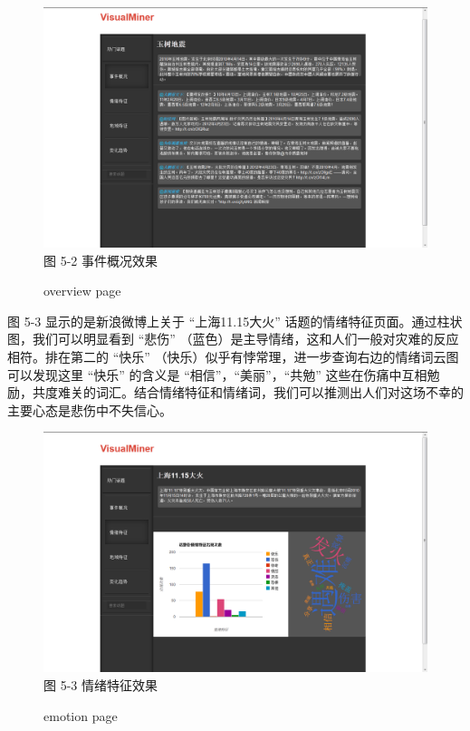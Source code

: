 \begin {figure}[!h]
\centering
\includegraphics[width=\textwidth, height=0.4\textheight]{show_overview}
图 5-2 事件概况效果
\caption{overview page}
\end{figure}


图 5-3 显示的是新浪微博上关于 “上海11.15大火” 话题的情绪特征页面。通过柱状图，我们可以明显看到 “悲伤” （蓝色）是主导情绪，这和人们一般对灾难的反应相符。排在第二的 “快乐” （快乐）似乎有悖常理，进一步查询右边的情绪词云图可以发现这里 “快乐” 的含义是 “相信”，“美丽”，“共勉” 这些在伤痛中互相勉励，共度难关的词汇。结合情绪特征和情绪词，我们可以推测出人们对这场不幸的主要心态是悲伤中不失信心。

\begin{figure}[!h]
\centering
\includegraphics[width=\textwidth, height=0.35\textheight]{show_emotion}
图 5-3 情绪特征效果
\caption{emotion page}
\end{figure}

